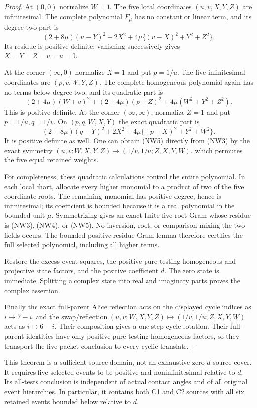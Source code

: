 \begin{proof}
At $(0,0)$ normalize $W=1$. The five local coordinates
$(u,v,X,Y,Z)$ are infinitesimal. The complete polynomial $F_\mu$
has no constant or linear term, and its degree-two part is
\[
 (2+8\mu)(u-Y)^2+2X^2
       +4\mu\{(v-X)^2+Y^2+Z^2\}.                    \tag{NW3}
\]
Its residue is positive definite: vanishing successively gives
$X=Y=Z=v=u=0$.

At the corner $(\infty,0)$ normalize $X=1$ and put $p=1/u$.
The five infinitesimal coordinates are $(p,v,W,Y,Z)$. The complete
homogeneous polynomial again has no terms below degree two, and its
quadratic part is
\[
 (2+4\mu)(W+v)^2+(2+4\mu)(p+Z)^2
                         +4\mu(W^2+Y^2+Z^2).        \tag{NW4}
\]
This is positive definite. At the corner $(\infty,\infty)$,
normalize $Z=1$ and put $p=1/u,q=1/v$. On $(p,q,W,X,Y)$ the exact
quadratic part is
\[
 (2+8\mu)(q-Y)^2+2X^2
                         +4\mu\{(p-X)^2+Y^2+W^2\}. \tag{NW5}
\]
It is positive definite as well. One can obtain (NW5) directly from
(NW3) by the exact symmetry
$(u,v;W,X,Y,Z)\mapsto(1/v,1/u;Z,X,Y,W)$, which permutes the five
equal retained weights.

For completeness, these quadratic calculations control the entire
polynomial. In each local chart, allocate every higher monomial to a
product of two of the five coordinate roots. The remaining monomial
has positive degree, hence is infinitesimal; its coefficient is bounded
because it is a real polynomial in the bounded unit $\mu$. Symmetrizing
gives an exact finite five-root Gram whose residue is (NW3), (NW4), or
(NW5). No inversion, root, or comparison mixing the two fields occurs.
The bounded positive-residue Gram lemma therefore certifies the full
selected polynomial, including all higher terms.

Restore the excess event squares, the positive pure-testing homogeneous
and projective state factors, and the positive coefficient $d$. The
zero state is immediate. Splitting a complex state into real and
imaginary parts proves the complex assertion.

Finally the exact full-parent Alice reflection acts on the displayed
cycle indices as $i\mapsto7-i$, and the swap/reflection
$(u,v;W,X,Y,Z)\mapsto(1/v,1/u;Z,X,Y,W)$ acts as $i\mapsto6-i$.
Their composition gives a one-step cycle rotation. Their full-parent
identities have only positive pure-testing homogeneous factors, so they
transport the five-packet conclusion to every cyclic translate.
\end{proof}

This theorem is a sufficient source domain, not an exhaustive zero-$d$
source cover. It requires five selected events to be positive and
noninfinitesimal relative to $d$. Its all-tests conclusion is independent
of actual contact angles and of all original event hierarchies. In
particular, it contains both C1 and C2 sources with all six retained
events bounded below relative to $d$.
